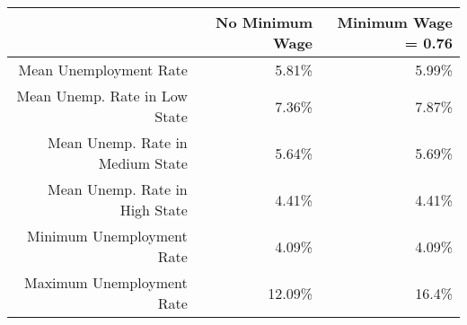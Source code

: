 \begin{tabular}{rrr}
  \hline
   & \textbf{No Minimum Wage} & \textbf{Minimum Wage = 0.76} \\\hline
  Mean Unemployment Rate & 5.81\% & 5.99\% \\
  Mean Unemp. Rate in Low State & 7.36\% & 7.87\% \\
  Mean Unemp. Rate in Medium State & 5.64\% & 5.69\% \\
  Mean Unemp. Rate in High State & 4.41\% & 4.41\% \\
  Minimum Unemployment Rate & 4.09\% & 4.09\% \\
  Maximum Unemployment Rate & 12.09\% & 16.4\% \\\hline
\end{tabular}
